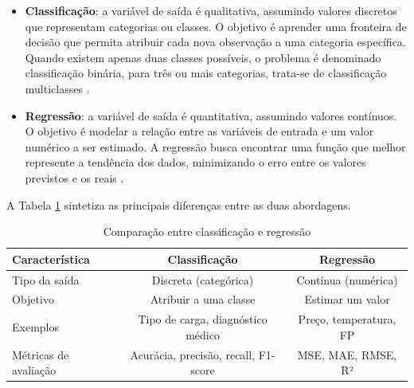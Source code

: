\begin{itemize}
    \item \textbf{Classificação}: a variável de saída é qualitativa, assumindo valores discretos que representam categorias ou classes. O objetivo é aprender uma fronteira de decisão que permita atribuir cada nova observação a uma categoria específica. Quando existem apenas duas classes possíveis, o problema é denominado classificação binária, para três ou mais categorias, trata-se de classificação multiclasses \cite{codecademy_classification, microsoft_classificacao}.
    
    \item \textbf{Regressão}: a variável de saída é quantitativa, assumindo valores contínuos. O objetivo é modelar a relação entre as variáveis de entrada e um valor numérico a ser estimado. A regressão busca encontrar uma função que melhor represente a tendência dos dados, minimizando o erro entre os valores previstos e os reais \cite{ibm_regressao}.
\end{itemize}


A Tabela \ref{tab:comparacao_class_reg} sintetiza as principais diferenças entre as duas abordagens.

\begin{table}[h]
    \centering
    \caption{Comparação entre classificação e regressão}
    \label{tab:comparacao_class_reg}
    \begin{tabular}{lcc}
    \hline
    \textbf{Característica} & \textbf{Classificação} & \textbf{Regressão} \\
    \hline
    Tipo da saída & Discreta (categórica) & Contínua (numérica) \\
    Objetivo & Atribuir a uma classe & Estimar um valor \\
    Exemplos & Tipo de carga, diagnóstico médico & Preço, temperatura, FP \\
    Métricas de avaliação & Acurácia, precisão, recall, F1-score & MSE, MAE, RMSE, R² \\
    \hline
    \end{tabular}
\end{table}



